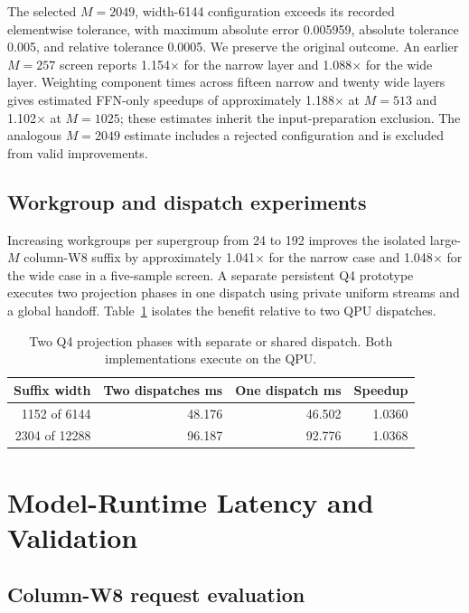 \documentclass[sigplan,screen,review]{acmart}
\begin{document}
The selected \(M=2049\), width-6144 configuration exceeds its recorded elementwise tolerance, with maximum absolute error 0.005959, absolute tolerance 0.005, and relative tolerance 0.0005. We preserve the original outcome. An earlier \(M=257\) screen reports 1.154$\times$ for the narrow layer and 1.088$\times$ for the wide layer. Weighting component times across fifteen narrow and twenty wide layers gives estimated FFN-only speedups of approximately 1.188$\times$ at \(M=513\) and 1.102$\times$ at \(M=1025\); these estimates inherit the input-preparation exclusion. The analogous \(M=2049\) estimate includes a rejected configuration and is excluded from valid improvements.

\subsection{Workgroup and dispatch experiments}

Increasing workgroups per supergroup from 24 to 192 improves the isolated large-\(M\) column-W8 suffix by approximately 1.041$\times$ for the narrow case and 1.048$\times$ for the wide case in a five-sample screen. A separate persistent Q4 prototype executes two projection phases in one dispatch using private uniform streams and a global handoff. Table~\ref{tab:persistent-two-phase} isolates the benefit relative to two QPU dispatches.

\begin{table}[t]
\centering
\caption{Two Q4 projection phases with separate or shared dispatch. Both implementations execute on the QPU.}
\label{tab:persistent-two-phase}
\small
\begin{tabular}{@{}rrrr@{}}
\toprule
Suffix width & Two dispatches ms & One dispatch ms & Speedup \\
\midrule
1152 of 6144 & 48.176 & 46.502 & 1.0360 \\
2304 of 12288 & 96.187 & 92.776 & 1.0368 \\
\bottomrule
\end{tabular}
\end{table}

\section{Model-Runtime Latency and Validation}
\label{app:requests}

\subsection{Column-W8 request evaluation}
\end{document}
